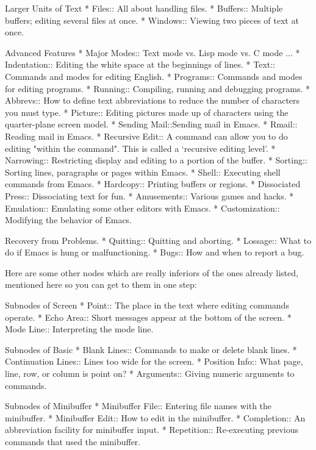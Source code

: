 Larger Units of Text
* Files::       All about handling files.
* Buffers::     Multiple buffers; editing several files at once.
* Windows::     Viewing two pieces of text at once.

Advanced Features
* Major Modes:: Text mode vs. Lisp mode vs. C mode ...
* Indentation:: Editing the white space at the beginnings of lines.
* Text::        Commands and modes for editing English.
* Programs::    Commands and modes for editing programs.
* Running::     Compiling, running and debugging programs.
* Abbrevs::     How to define text abbreviations to reduce
                 the number of characters you must type.
* Picture::     Editing pictures made up of characters
                 using the quarter-plane screen model.
* Sending Mail::Sending mail in Emacs.
* Rmail::       Reading mail in Emacs.
* Recursive Edit::
                A command can allow you to do editing
                 "within the command".  This is called a
                 `recursive editing level'.
* Narrowing::   Restricting display and editing to a portion
                 of the buffer.
* Sorting::	Sorting lines, paragraphs or pages within Emacs.
* Shell::       Executing shell commands from Emacs.
* Hardcopy::	Printing buffers or regions.
* Dissociated Press::  Dissociating text for fun.
* Amusements::         Various games and hacks.
* Emulation::	       Emulating some other editors with Emacs.
* Customization::      Modifying the behavior of Emacs.

Recovery from Problems.
* Quitting::    Quitting and aborting.
* Lossage::     What to do if Emacs is hung or malfunctioning.
* Bugs::        How and when to report a bug.

Here are some other nodes which are really inferiors of the ones
already listed, mentioned here so you can get to them in one step:

Subnodes of Screen
* Point::	The place in the text where editing commands operate.
* Echo Area::   Short messages appear at the bottom of the screen.
* Mode Line::	Interpreting the mode line.

Subnodes of Basic
* Blank Lines:: Commands to make or delete blank lines.
* Continuation Lines:: Lines too wide for the screen.
* Position Info::      What page, line, row, or column is point on?
* Arguments::          Giving numeric arguments to commands.

Subnodes of Minibuffer
* Minibuffer File::    Entering file names with the minibuffer.
* Minibuffer Edit::    How to edit in the minibuffer.
* Completion::  An abbreviation facility for minibuffer input.
* Repetition::  Re-executing previous commands that used the minibuffer.

